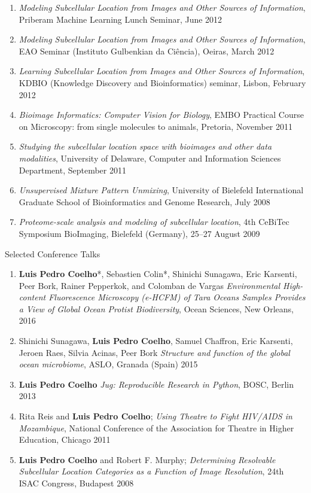 \documentclass{article}
\renewcommand\subsection[1]{%
    \par\vspace{.1em}%
    {\hspace{1em}\subsubhead #1}%
    \par\vspace{.2em}%
}
\begin{document}
\begin{enumerate}
\item \emph{Modeling Subcellular Location from Images and Other Sources of
Information}, Priberam Machine Learning Lunch Seminar, June 2012
\item \emph{Modeling Subcellular Location from Images and Other Sources of
Information}, EAO Seminar (Instituto Gulbenkian da Ciência), Oeiras, March 2012
\item \emph{Learning Subcellular Location from Images and Other Sources of
Information}, KDBIO (Knowledge Discovery and Bioinformatics) seminar, Lisbon,
February 2012
\item \emph{Bioimage Informatics: Computer Vision for Biology}, EMBO Practical
Course on Microscopy: from single molecules to animals, Pretoria, November 2011
\item \emph{Studying the subcellular location space with bioimages and other
data modalities}, University of Delaware, Computer and Information Sciences
Department, September 2011
\item \emph{Unsupervised Mixture Pattern Unmixing}, University of Bielefeld
International Graduate School of Bioinformatics and Genome Research, July 2008
\item \emph{Proteome-scale analysis and modeling of subcellular location}, 4th
CeBiTec Symposium BioImaging, Bielefeld (Germany), 25--27 August 2009
\end{enumerate}

\subsection{Selected Conference Talks}

\begin{enumerate}
\item \textbf{Luis Pedro Coelho}*, Sebastien Colin*, Shinichi Sunagawa, Eric
Karsenti, Peer Bork, Rainer Pepperkok, and Colomban de Vargas
\emph{Environmental High-content Fluorescence Microscopy (e-HCFM) of Tara
Oceans Samples Provides a View of Global Ocean Protist Biodiversity}, Ocean
Sciences, New Orleans, 2016
\item Shinichi Sunagawa, \textbf{Luis Pedro Coelho}, Samuel Chaffron, Eric
Karsenti, Jeroen Raes, Silvia Acinas, Peer Bork \emph{Structure and function of
the global ocean microbiome}, ASLO, Granada (Spain) 2015
\item \textbf{Luis Pedro Coelho} \emph{Jug: Reproducible Research in Python},
BOSC, Berlin 2013
\item Rita Reis and \textbf{Luis Pedro Coelho}; \emph{Using Theatre to Fight
HIV/AIDS in Mozambique}, National Conference of the Association for Theatre in
Higher Education, Chicago 2011
\item \textbf{Luis Pedro Coelho} and Robert F. Murphy; \emph{Determining
Resolvable Subcellular Location Categories as a Function of Image Resolution},
24th ISAC Congress, Budapest 2008
\end{enumerate}
\end{document}
